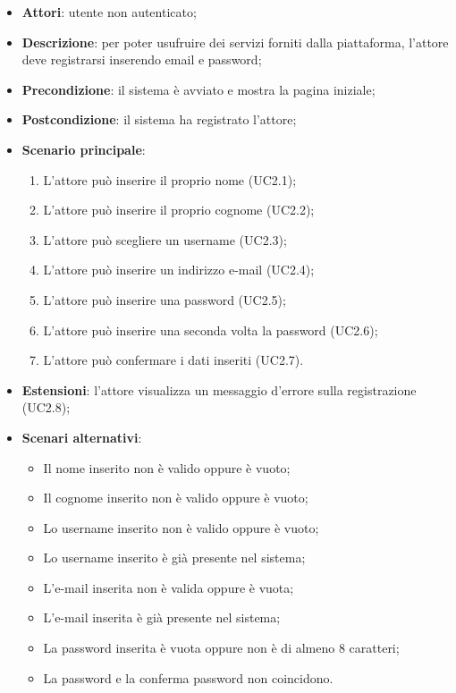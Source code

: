 \begin{itemize}
\item \textbf{Attori}: utente non autenticato;
\item \textbf{Descrizione}: per poter usufruire dei servizi forniti dalla piattaforma, l'attore deve registrarsi inserendo email e password;
\item \textbf{Precondizione}: il sistema è avviato e mostra la pagina iniziale;
\item \textbf{Postcondizione}: il sistema ha registrato l'attore;
\item \textbf{Scenario principale}:
	\begin{enumerate}
	\item L'attore può inserire il proprio nome (UC2.1);
	\item L'attore può inserire il proprio cognome (UC2.2);
	\item L'attore può scegliere un username (UC2.3);
	\item L'attore può inserire un indirizzo e-mail (UC2.4);
	\item L'attore può inserire una password (UC2.5);
	\item L'attore può inserire una seconda volta la password (UC2.6);
	\item L'attore può confermare i dati inseriti (UC2.7).
	\end{enumerate}
\item \textbf{Estensioni}: l'attore visualizza un messaggio d'errore sulla registrazione (UC2.8);
\item \textbf{Scenari alternativi}:
	\begin{itemize}
	\item Il nome inserito non è valido oppure è vuoto;
	\item Il cognome inserito non è valido oppure è vuoto;
	\item Lo username inserito non è valido oppure è vuoto;
	\item Lo username inserito è già presente nel sistema;
	\item L'e-mail inserita non è valida oppure è vuota;
	\item L'e-mail inserita è già presente nel sistema;
	\item La password inserita è vuota oppure non è di almeno 8 caratteri;
	\item La password e la conferma password non coincidono.
	\end{itemize}
\end{itemize}


